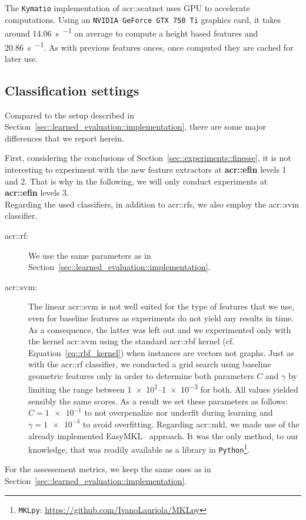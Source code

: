             The \verb!Kymatio! implementation of \gls{acr::scatnet} uses GPU to accelerate computations.
            Using an \verb!NVIDIA GeForce GTX 750 Ti! graphics card, it takes around \SI{14.06}{\s \per \building} on average to compute a height based features and \SI{20.86}{\s \per \building}.
            As with previous features onces, once computed they are cached for later use.

    \subsection{Classification settings}
        \label{subsec::better_representation::implementation::classification}
        Compared to the setup described in Section~\ref{sec::learned_evaluation::implementation}, there are some major differences that we report herein.

        First, considering the conclusions of Section~\ref{sec::experiments::finesse}, it is not interesting to experiment with the new feature extractors at \textbf{\gls{acr::efin}} levels 1 and 2.
        That is why in the following, we will only conduct experiments at \textbf{\gls{acr::efin}} levels 3.\\

        Regarding the used classifiers, in addition to \glspl{acr::rf}, we also employ the \gls{acr::svm} classifier.
        \begin{description}
            \item[\gls{acr::rf}: ] We use the same parameters as in Section~\ref{sec::learned_evaluation::implementation}.
            \item[\gls{acr::svm}: ] The linear \gls{acr::svm} is not well suited for the type of features that we use, even for baseline features as experiments do not yield any results in time.
                As a consequence, the latter was left out and we experimented only with the kernel \gls{acr::svm} using the standard \gls{acr::rbf} kernel (cf. Equation~\ref{eq::rbf_kernel}) when instances are vectors not graphs.
                Just as with the \gls{acr::rf} classifier, we conducted a grid search using baseline geometric features only in order to determine both parameters \(C\) and \(\gamma\) by limiting the range between \numrange[range-phrase={ and }, scientific-notation = true]{1e1}{1e-3} for both.
                All values yielded sensibly the same scores.
                As a result we set these parameters as follows: \(C = \num[scientific-notation = true]{1e-1}\) to not overpenalize nor underfit during learning and \(\gamma = \num[scientific-notation = true]{1e-3}\) to avoid overfitting.
                Regarding \gls{acr::mkl}, we made use of the already implemented EasyMKL~\parencite{aiolli2015easymkl} approach.
                It was the only method, to our knowledge, that was readily available as a library in \verb!Python!\footnote{\verb!MKLpy!: \href{https://github.com/IvanoLauriola/MKLpy}{\url{https://github.com/IvanoLauriola/MKLpy}}}.
        \end{description}

        For the assessement metrics, we keep the same ones as in Section~\ref{sec::learned_evaluation::implementation}.
